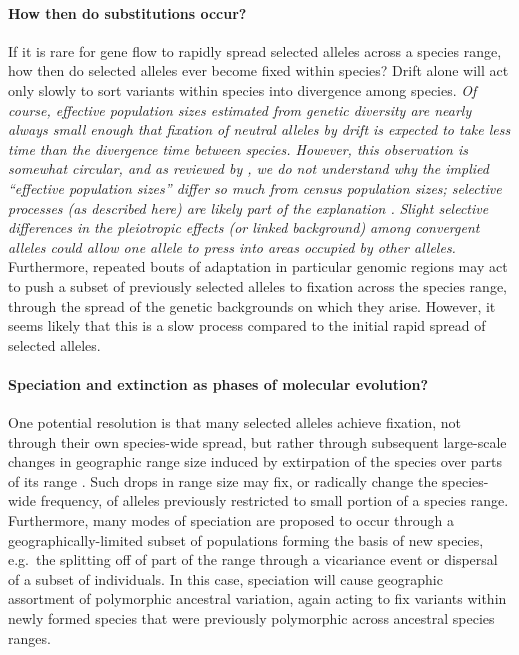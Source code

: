 \documentclass{article}
\newcommand{\gc}[1]{{\it\color{blue}#1}}
\newcommand{\plr}[1]{{\it\color{Fuchsia}#1}}
\begin{document}
\paragraph{How then do substitutions occur?}
If it is rare for gene flow to rapidly spread selected alleles across a species range, 
how then do selected alleles ever become fixed within species? 
Drift alone will act only slowly to sort variants within species into
divergence among species. 
\plr{Of course, effective population sizes estimated from genetic diversity
    are nearly always small enough that fixation of neutral alleles by drift
    is expected to take less time than the divergence time between species.
    However, this observation is somewhat circular,
    and as reviewed by \citet{leffler2012revisiting},
    we do not understand why the implied ``effective population sizes'' differ so much
    from census population sizes;
    selective processes (as described here) are likely part of the explanation \citep{corbettdetig2015natural}.
}
\gc{Slight selective differences in the pleiotropic effects (or linked
  background) among convergent alleles could allow one allele to
  press into areas occupied by other alleles.}
Furthermore, repeated bouts of adaptation in particular genomic regions may act 
to push a subset of previously selected alleles to fixation across the
species range, through the spread of the genetic backgrounds on which
they arise.  
However, it seems likely that this is a slow process compared to the
initial rapid spread of selected alleles.
\
\paragraph{Speciation and extinction as phases of molecular evolution?}
One potential resolution is that many selected alleles achieve
fixation, not through their own species-wide spread, but rather
through subsequent large-scale changes in geographic range size
induced by extirpation of the species over parts of its range
\citep[see ][and references therein for how such a model could be constructed]{barton2013modelling}. 
Such drops in range size may fix, or radically change the species-wide frequency, 
of alleles previously restricted to small portion of a species range. 
Furthermore, many modes of speciation are proposed to occur through a
geographically-limited subset of populations forming the basis of new species, 
e.g.\ the splitting off of part of the range through a vicariance event 
or dispersal of a subset of individuals. 
In this case, speciation will cause geographic assortment of
polymorphic ancestral variation, again acting to fix variants within
newly formed species that were previously polymorphic across ancestral species ranges. 
\end{document}
